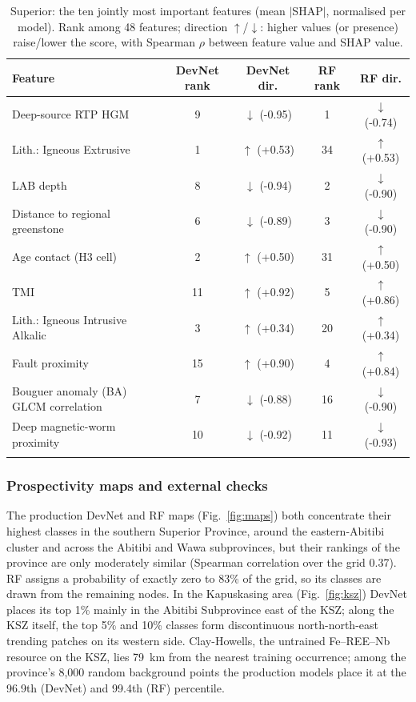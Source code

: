 \documentclass[pdflatex,sn-apa]{sn-jnl}
\begin{document}
\begin{table}[t]
\caption{Superior: the ten jointly most important features (mean $|$SHAP$|$, normalised per model). Rank among 48 features; direction $\uparrow$/$\downarrow$: higher values (or presence) raise/lower the score, with Spearman $\rho$ between feature value and SHAP value.}\label{tab:shap}
\scriptsize
\setlength{\tabcolsep}{2.5pt}
\begin{tabular*}{\textwidth}{@{\extracolsep\fill}lcccc}
\toprule
Feature & DevNet rank & DevNet dir. & RF rank & RF dir. \\
\midrule
Deep-source RTP HGM & 9 & $\downarrow$ (-0.95) & 1 & $\downarrow$ (-0.74) \\
Lith.: Igneous Extrusive & 1 & $\uparrow$ (+0.53) & 34 & $\uparrow$ (+0.53) \\
LAB depth & 8 & $\downarrow$ (-0.94) & 2 & $\downarrow$ (-0.90) \\
Distance to regional greenstone & 6 & $\downarrow$ (-0.89) & 3 & $\downarrow$ (-0.90) \\
Age contact (H3 cell) & 2 & $\uparrow$ (+0.50) & 31 & $\uparrow$ (+0.50) \\
TMI & 11 & $\uparrow$ (+0.92) & 5 & $\uparrow$ (+0.86) \\
Lith.: Igneous Intrusive Alkalic & 3 & $\uparrow$ (+0.34) & 20 & $\uparrow$ (+0.34) \\
Fault proximity & 15 & $\uparrow$ (+0.90) & 4 & $\uparrow$ (+0.84) \\
Bouguer anomaly (BA) GLCM correlation & 7 & $\downarrow$ (-0.88) & 16 & $\downarrow$ (-0.90) \\
Deep magnetic-worm proximity & 10 & $\downarrow$ (-0.92) & 11 & $\downarrow$ (-0.93) \\
\botrule
\end{tabular*}
\end{table}

\subsubsection{Prospectivity maps and external checks}\label{sec:res-maps}

The production DevNet and RF maps (Fig.~\ref{fig:maps}) both concentrate their highest classes in the southern Superior Province, around the eastern-Abitibi cluster and across the Abitibi and Wawa subprovinces, but their rankings of the province are only moderately similar (Spearman correlation over the grid 0.37). RF assigns a probability of exactly zero to 83\% of the grid, so its classes are drawn from the remaining nodes. In the Kapuskasing area (Fig.~\ref{fig:ksz}) DevNet places its top 1\% mainly in the Abitibi Subprovince east of the KSZ; along the KSZ itself, the top 5\% and 10\% classes form discontinuous north-north-east trending patches on its western side. Clay-Howells, the untrained Fe--REE--Nb resource on the KSZ, lies 79~km from the nearest training occurrence; among the province's 8,000 random background points the production models place it at the 96.9th (DevNet) and 99.4th (RF) percentile.
\end{document}

